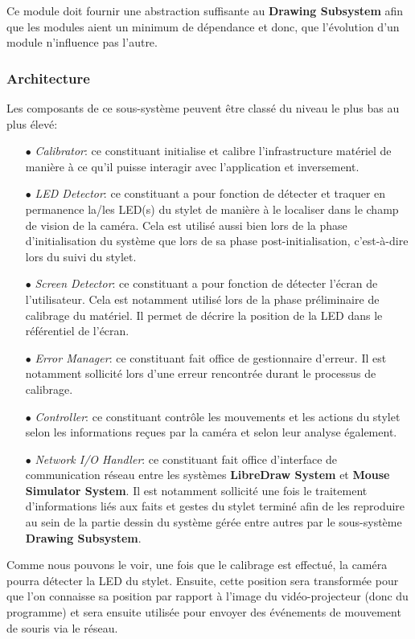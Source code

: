 \documentclass[11pt,a4paper,oldfontcommands]{memoir}
\begin{document}
Ce module doit fournir une abstraction suffisante au \textbf{Drawing Subsystem} afin que les modules aient un minimum de dépendance et donc, que l'évolution d'un module n'influence pas l'autre.

\subsubsection{Architecture}

Les composants de ce sous-système peuvent être classé du niveau le plus bas au plus élevé:

\begin{itemize}
\item[$\bullet$] \textit{Calibrator}: ce constituant initialise et calibre l'infrastructure matériel de manière à ce qu'il puisse interagir avec l'application et inversement.
\item[$\bullet$] \textit{LED Detector}: ce constituant a pour fonction de détecter et traquer en permanence la/les LED(s) du stylet de manière à le localiser dans le champ de vision de la caméra. Cela est utilisé aussi bien lors de la phase d'initialisation du système que lors de sa phase post-initialisation, c'est-à-dire lors du suivi du stylet.
\item[$\bullet$] \textit{Screen Detector}: ce constituant a pour fonction de détecter l'écran de l'utilisateur. Cela est notamment utilisé lors de la phase préliminaire de calibrage du matériel. Il permet de décrire la position de la LED dans le référentiel de l'écran.
\item[$\bullet$] \textit{Error Manager}: ce constituant fait office de gestionnaire d'erreur. Il est notamment sollicité lors d'une erreur rencontrée durant le processus de calibrage.
\item[$\bullet$] \textit{Controller}: ce constituant contrôle les mouvements et les actions du stylet selon les informations reçues par la caméra et selon leur analyse également.
\item[$\bullet$] \textit{Network I/O Handler}: ce constituant fait office d'interface de communication réseau entre les systèmes \textbf{LibreDraw System} et \textbf{Mouse Simulator System}. Il est notamment sollicité une fois le traitement d'informations liés aux faits et gestes du stylet terminé afin de les reproduire au sein de la partie dessin du système gérée entre autres par le sous-système \textbf{Drawing Subsystem}.
\end{itemize}

Comme nous pouvons le voir, une fois que le calibrage est effectué, la caméra pourra détecter la LED du stylet. Ensuite, cette position sera transformée pour que l'on connaisse sa position par rapport à l'image du vidéo-projecteur (donc du programme) et sera ensuite utilisée pour envoyer des événements de mouvement de souris via le réseau.
\end{document}

